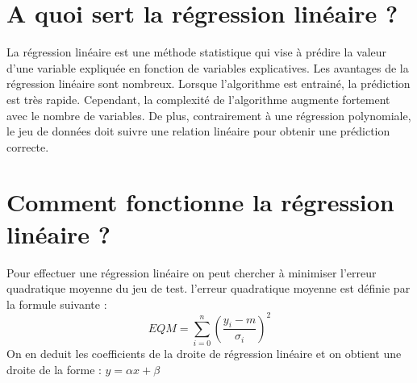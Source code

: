 \documentclass[a0,portrait]{a0poster}
\begin{document}




\color{SaddleBrown} %

\section*{A quoi sert la régression linéaire ?}

La régression linéaire est une méthode statistique qui vise à prédire la valeur d’une variable expliquée en fonction de variables explicatives. Les avantages de la régression linéaire sont nombreux. Lorsque l’algorithme est entrainé, la prédiction est très rapide. Cependant, la complexité de l’algorithme augmente fortement avec le nombre de variables. De plus, contrairement à une régression polynomiale, le jeu de données doit suivre une relation linéaire pour obtenir une prédiction correcte.


\color{DarkSlateGray} %

\section*{Comment fonctionne la régression linéaire ?}

Pour effectuer une régression linéaire on peut chercher à minimiser l'erreur quadratique moyenne du jeu de test. l'erreur quadratique moyenne est définie par la formule suivante :
$$EQM=\sum_{i=0}^{n}(\frac{ y_i-m}{\sigma_i})^2$$
On en deduit les coefficients de la droite de régression linéaire et on obtient une droite de la forme : $y=\alpha x + \beta$

\end{document}
